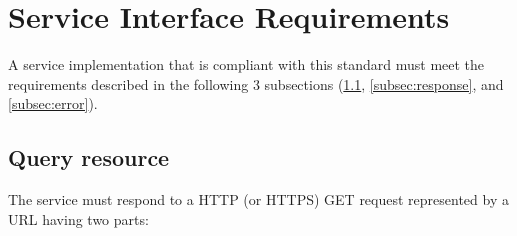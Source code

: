 \documentclass[11pt,a4paper]{ivoa}
\begin{document}
\section{Service Interface Requirements}
\label{sec:2}

A service implementation that is compliant with this standard must meet
the requirements described in the following 3 subsections
(\ref{subsec:baseurl}, \ref{subsec:response}, and \ref{subsec:error}).

\subsection{Query resource}
\label{subsec:baseurl}

The service must respond to a HTTP (or HTTPS) GET request
represented by a URL having two parts:\\ 
\end{document}
